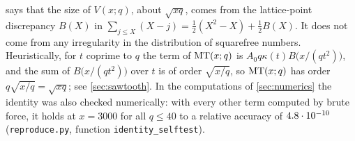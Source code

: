 \begin{remark}
 says that the size of $V(x;q)$, about $\sqrt{xq}$, comes from the lattice-point discrepancy $B(X)$ in $\sum_{j\le X}(X-j)=\frac12(X^2-X)+\frac12B(X)$. It does not come from any irregularity in the distribution of squarefree numbers. Heuristically, for $t$ coprime to $q$ the term of $\mathrm{MT}(x;q)$ is $A_0q\kappa(t)B\bigl(x/(qt^2)\bigr)$, and the sum of $B\bigl(x/(qt^2)\bigr)$ over $t$ is of order $\sqrt{x/q}$, so $\mathrm{MT}(x;q)$ has order $q\sqrt{x/q}=\sqrt{xq}$; see \cref{sec:sawtooth}. In the computations of \cref{sec:numerics} the identity was also checked numerically: with every other term computed by brute force, it holds at $x=3000$ for all $q\le40$ to a relative accuracy of $4.8\cdot 10^{-10}$ (\texttt{reproduce.py}, function \texttt{identity\_selftest}).
\end{remark}
